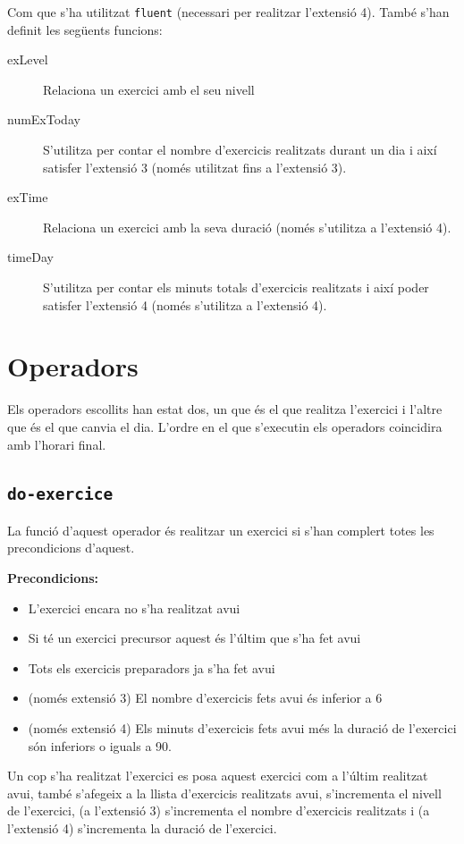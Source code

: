 \documentclass[a4paper,12pt, UTF-8]{article}
\begin{document}
Com que s'ha utilitzat \verb|fluent| (necessari per realitzar l'extensió 4). També s'han definit les següents funcions:
\begin{description}
	\item[exLevel] Relaciona un exercici amb el seu nivell
	\item[numExToday] S'utilitza per contar el nombre d'exercicis realitzats durant un dia i així satisfer l'extensió 3 (només utilitzat fins a l'extensió 3).
	\item[exTime] Relaciona un exercici amb la seva duració (només s'utilitza a l'extensió 4).
	\item[timeDay] S'utilitza per contar els minuts totals d'exercicis realitzats i així poder satisfer l'extensió 4 (només s'utilitza a l'extensió 4).
\end{description}

\section{Operadors}

Els operadors escollits han estat dos, un que és el que realitza l'exercici i l'altre que és el que canvia el dia. L'ordre en el que s'executin els operadors coincidira amb l'horari final.

\subsection{\texttt{do-exercice}}

La funció d'aquest operador és realitzar un exercici si s'han complert totes les precondicions d'aquest.

\textbf{Precondicions: } 
\begin{itemize}
	\item L'exercici encara no s'ha realitzat avui
	\item Si té un exercici precursor aquest és l'últim que s'ha fet avui
	\item Tots els exercicis preparadors ja s'ha fet avui
	\item (només extensió 3) El nombre d'exercicis fets avui és inferior a 6
	\item (només extensió 4) Els minuts d'exercicis fets avui més la duració de l'exercici són inferiors o iguals a 90.
\end{itemize}

Un cop s'ha realitzat l'exercici es posa aquest exercici com a l'últim realitzat avui, també s'afegeix a la llista d'exercicis realitzats avui, s'incrementa el nivell de l'exercici, (a l'extensió 3) s'incrementa el nombre d'exercicis realitzats i (a l'extensió 4) s'incrementa la duració de l'exercici.
\end{document}
